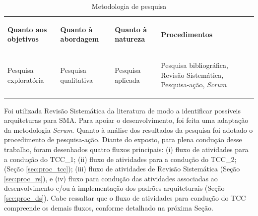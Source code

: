 \begin{table}[h]
 \centering
 \caption{Metodologia de pesquisa}
 \label{tab:metodologia_pesquisa}
 {\renewcommand\arraystretch{0.25}
 \begin{tabular}{ l l l l }
  \hline
    \multicolumn{1}{p{2.517cm}}{\begin{center}\textbf{Quanto aos objetivos}
\end{center}} &
    \multicolumn{1}{p{2.600cm}}{\begin{center}\textbf{Quanto à abordagem}
\end{center}} &
    \multicolumn{1}{p{2.583cm}}{\begin{center}\textbf{Quanto à natureza}
\end{center}} &
    \multicolumn{1}{p{3.583cm}}{\begin{center}\textbf{Procedimentos}
\end{center}}
  \\  
  \cline{1-1}\cline{2-2}\cline{3-3}\cline{4-4}  
    \multicolumn{1}{p{2.517cm}}{\begin{center}Pesquisa exploratória \end{center}} &
    \multicolumn{1}{p{2.517cm}}{\begin{center}Pesquisa qualitativa\end{center}} &
    \multicolumn{1}{p{2.600cm}}{\begin{center}Pesquisa aplicada\end{center}} &
    \multicolumn{1}{p{4.583cm}}{\begin{center}Pesquisa bibliográfica, Revisão Sistemática, Pesquisa-ação, \textit{Scrum}\end{center}}
  \\  
  \hline

 \end{tabular} }
\end{table}

Foi utilizada Revisão Sistemática da literatura de modo a identificar possíveis arquiteturas para SMA. Para apoiar o desenvolvimento, foi feita uma adaptação da metodologia \textit{Scrum}. Quanto à análise dos resultados da pesquisa foi adotado o procedimento de pesquisa-ação. Diante do exposto, para plena condução desse trabalho, foram desenhados quatro fluxos principais: (i) fluxo de atividades para a condução do TCC\_1; (ii) fluxo de atividades para a condução do TCC\_2; (Seção \ref{sec:proc_tcc}); (iii) fluxo de atividades de Revisão Sistemática (Seção \ref{sec:proc_rs}), e (iv) fluxo  para condução das atividades associadas ao desenvolvimento e/ou à implementação dos padrões arquiteturais (Seção \ref{sec:proc_ds}). Cabe ressaltar que o fluxo de atividades para condução do TCC compreende os demais fluxos, conforme detalhado na próxima Seção.


